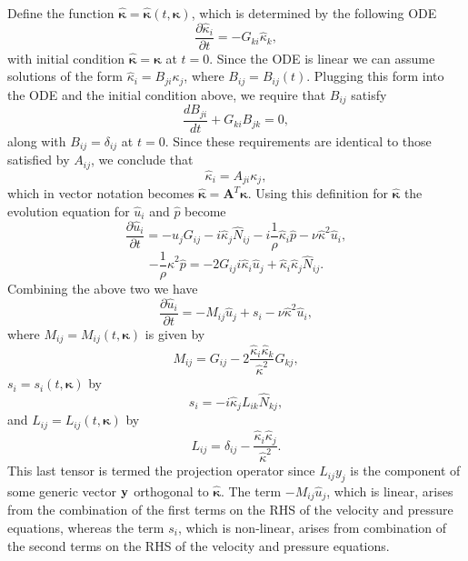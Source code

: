 \documentclass[oneside,a4paper,11pt]{report}
\newcommand{\kappavec}{\boldsymbol{\kappa}}
\begin{document}
Define the function $\hat{\kappavec} = \hat{\kappavec}(t,\kappavec)$, which is determined by the following ODE
\begin{equation}
\frac{\partial \hat{\kappa}_i}{\partial t} = -G_{ki} \hat{\kappa}_k,
\end{equation}
with initial condition $\hat{\kappavec} = \kappavec$ at $t = 0$. Since the ODE is linear we can assume solutions of the form $\hat{\kappa}_i = B_{ji} \kappa_j$, where $B_{ij} = B_{ij}(t)$. Plugging this form into the ODE and the initial condition above, we require that $B_{ij}$ satisfy
\begin{equation}
\frac{d B_{ji}}{dt} + G_{ki} B_{jk} = 0,
\end{equation}
along with $B_{ij} = \delta_{ij}$ at $t=0$. Since these requirements are identical to those satisfied by $A_{ij}$, we conclude that 
\begin{equation}
\hat{\kappa}_i = A_{ji} \kappa_j,
\end{equation}
which in vector notation becomes $\hat{\kappavec} = \mathbf{A}^T\kappavec$. Using this definition for $\hat{\kappavec}$ the evolution equation for $\hat{u}_i$ and $\hat{p}$ become
\begin{equation}
\frac{\partial \hat{u}_i }{\partial t } = -\hat{u}_j G_{ij} - i \hat{\kappa}_j  \hat{N}_{ij} - i\frac{1}{\rho} \hat{\kappa}_i  \hat{p} - \nu  \hat{\kappa}^2 \hat{u}_i,
\end{equation}
\begin{equation}
-\frac{1}{\rho} \hat{\kappa}^2 \hat{p} = -2 G_{ij} i \hat{\kappa}_i \hat{u}_j + \hat{\kappa}_i \hat{\kappa}_j \hat{N}_{ij}.
\end{equation}
Combining the above two we have
\begin{equation}
\label{vhat_evol_homo}
\frac{\partial \hat{u}_i }{\partial t } = -M_{ij}\hat{u}_j + s_i  - \nu  \hat{\kappa}^2 \hat{u}_i,
\end{equation}
where $M_{ij} = M_{ij}(t,\kappavec)$ is given by
\begin{equation}
M_{ij} = G_{ij} - 2 \frac{\hat{\kappa}_i \hat{\kappa}_k}{\hat{\kappa}^2} G_{kj},
\end{equation}
$s_{i} = s_{i}(t,\kappavec)$ by
\begin{equation}
s_{i} = -i \hat{\kappa}_j L_{ik}\hat{N}_{kj},
\end{equation}
and $L_{ij} = L_{ij}(t,\kappavec)$ by
\begin{equation}
L_{ij} = \delta_{ij} - \frac{ \hat{\kappa}_i \hat{\kappa}_j}{\hat{\kappa}^2}.
\end{equation}
This last tensor is termed the projection operator since $L_{ij} y_j$ is the component of some generic vector $\mathbf{y}$ orthogonal to $\hat{\kappavec}$. The term $-M_{ij}\hat{u}_j$, which is linear, arises from the combination of the first terms on the RHS of the velocity and pressure equations, whereas the term $s_{i}$, which is non-linear, arises from combination of the second terms on the RHS of the velocity and pressure equations.
\end{document}

